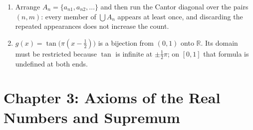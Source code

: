 \begin{enumerate}[label=\textbf{2.\arabic*}]
  \item Arrange $A_{n}=\{a_{n1},a_{n2},\dots\}$ and then run the Cantor diagonal over
        the pairs $(n,m)$: every member of $\bigcup A_{n}$ appears at least once,
        and discarding the repeated appearances does not increase the count.

  \item $g(x)=\tan\bigl(\pi(x-\tfrac12)\bigr)$ is a bijection from $(0,1)$ onto
        $\mathbb{R}$. Its domain must be restricted because $\tan$ is infinite
        at $\pm\tfrac12\pi$; on $[0,1]$ that formula is undefined at both ends.
\end{enumerate}

\section*{Chapter 3: Axioms of the Real Numbers and Supremum}
